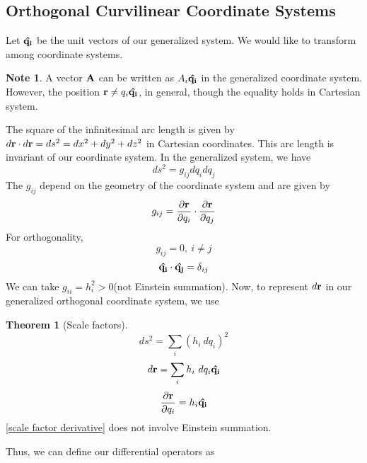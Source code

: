 \documentclass[10pt, a4paper]{extarticle}
\theoremstyle{definition}
\newtheorem{thm}{Theorem}
\newtheorem*{note*}{Note}
\numberwithin{equation}{subsection}
\begin{document}
\subsection{Orthogonal Curvilinear Coordinate Systems}
Let $\vu{q_i}$ be the unit vectors of our generalized system. We would like to transform among coordinate systems.
\begin{note*}
	A vector $\vb{A}$ can be written as $A_i\vu{q_i}$ in the generalized coordinate system. However, the position $\vb{r}\neq q_i\vu{q_i}$, in general, though the equality holds in Cartesian system.
\end{note*}
The square of the infinitesimal arc length is given by $d\vb{r}\cdot d\vb{r}=ds^2=dx^2+dy^2+dz^2$ in Cartesian coordinates. This arc length is invariant of our coordinate system. In the generalized system, we have
\begin{equation}ds^2=g_{ij}dq_idq_j\end{equation}
The $g_{ij}$ depend on the geometry of the coordinate system and are given by
\begin{equation}g_{ij}=\pdv{\vb{r}}{q_i}\cdot\pdv{\vb{r}}{q_j}\end{equation}
For orthogonality,
\begin{equation*}g_{ij}=0,\ i\neq j\end{equation*}\begin{equation*}\vu{q_i}\cdot\vu{q_j}=\delta_{ij}\end{equation*}
We can take $g_{ii}=h_i^2>0$(not Einstein summation). Now, to represent $d\vb{r}$ in our generalized orthogonal coordinate system, we use
\begin{framed}
	\begin{thm}[Scale factors]
		\begin{equation}ds^2=\sum_i(h_i\ dq_i)^2\end{equation}
		\begin{equation}d\vb{r}=\sum_i h_i\ dq_i\vu{q_i}\end{equation}
		\begin{equation}\label{scale factor derivative}\pdv{\vb{r}}{q_i}=h_i\vu{q_i}\end{equation}
		\eqref{scale factor derivative} does not involve Einstein summation.
	\end{thm}
\end{framed}
Thus, we can define our differential operators as
\end{document}

